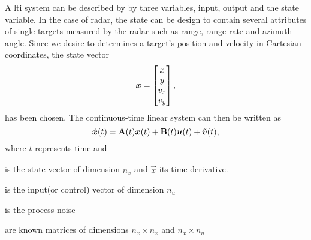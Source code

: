 A \ac{lti} system can be described by by three variables, input, output and the state variable. In the case of radar, the state can be design to contain several attributes of single targets measured by the radar such as range, range-rate and azimuth angle. Since we desire to determines a target's position and velocity in Cartesian coordinates, the state vector 
\begin{equation}
	\vec{x} = \begin{bmatrix}
	x \\ y \\ v_x \\ v_y
	\end{bmatrix}\\,
\end{equation}
has been chosen. The continuous-time linear system can then be written as
\begin{equation}
	\dot{\vec{x}}(t) = \matrix{A}(t)\vec{x}(t)+ \matrix{B}(t)\vec{u}(t) + \tilde{\vec{v}}(t)\\,
\end{equation}
where $t$ represents time and 
\begin{description}[align=left,labelwidth=1cm]
	\item[$\vec{x}$] is the state vector of dimension $n_x$ and $\dot{\vec{x}}$ its time derivative.
	\item[$\vec{u}$] is the input(or control) vector of dimension $n_u$
	\item[$\tilde{\vec{v}}$] is the process noise
	\item[$\matrix{A}$,$\matrix{B}$] are known matrices of dimensions $n_x\times n_x$ and $n_x\times n_u$
\end{description}